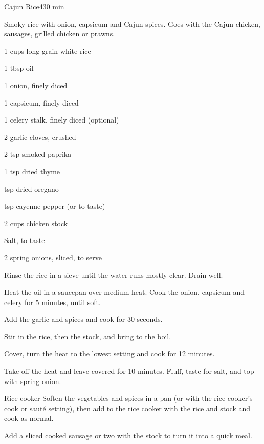 \begin{recipebox}{Cajun Rice}{4}{30 min}

Smoky rice with onion, capsicum and Cajun spices. Goes with the Cajun chicken,
sausages, grilled chicken or prawns.

\begin{ingredients}
  \item 1 cups long-grain white rice
  \item 1 tbsp oil
  \item 1 onion, finely diced
  \item 1 capsicum, finely diced
  \item 1 celery stalk, finely diced (optional)
  \item 2 garlic cloves, crushed
  \item 2 tsp smoked paprika
  \item 1 tsp dried thyme
  \item {} tsp dried oregano
  \item {} tsp cayenne pepper (or to taste)
  \item 2 cups chicken stock
  \item Salt, to taste
  \item 2 spring onions, sliced, to serve
\end{ingredients}

\begin{method}
  \item Rinse the rice in a sieve until the water runs mostly clear. Drain well.
  \item Heat the oil in a saucepan over medium heat. Cook the onion, capsicum and celery for 5 minutes, until soft.
  \item Add the garlic and spices and cook for 30 seconds.
  \item Stir in the rice, then the stock, and bring to the boil.
  \item Cover, turn the heat to the lowest setting and cook for 12 minutes.
  \item Take off the heat and leave covered for 10 minutes. Fluff, taste for salt, and top with spring onion.
\end{method}

\begin{variationbox}{Rice cooker}
Soften the vegetables and spices in a pan (or with the rice cooker's cook or sauté setting), then add to the rice cooker with the rice and stock and cook as normal.
\end{variationbox}

\begin{notelist}
  \item Add a sliced cooked sausage or two with the stock to turn it into a quick meal.
\end{notelist}

\end{recipebox}
